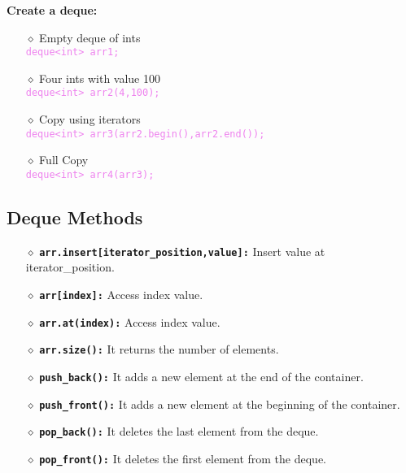 \textbf{Create a deque:}
\begin{itemize}
	\item[{\LARGE $\diamond$}] Empty deque of ints \\
		\tab \textcolor{violet}{\texttt{deque<int> arr1;}}
	\item[{\LARGE $\diamond$}] Four ints with value 100 \\
		\tab \textcolor{violet}{\texttt{deque<int> arr2(4,100);}}
	\item[{\LARGE $\diamond$}] Copy using iterators \\
		\tab \textcolor{violet}{\texttt{deque<int> arr3(arr2.begin(),arr2.end());}}
	\item[{\LARGE $\diamond$}] Full Copy \\
		\tab \textcolor{violet}{\texttt{deque<int> arr4(arr3);}}
\end{itemize}	

\subsection{Deque Methods}

\begin{itemize}
	\item[{\LARGE $\diamond$}]\textbf{\texttt{arr.insert[iterator\_position,value]:}} Insert value at iterator\_position.
	\item[{\LARGE $\diamond$}]\textbf{\texttt{arr[index]:}} Access index value.
	\item[{\LARGE $\diamond$}]\textbf{\texttt{arr.at(index):}} Access index value.
	\item[{\LARGE $\diamond$}]\textbf{\texttt{arr.size():}} It returns the number of elements.
	\item[{\LARGE $\diamond$}]\textbf{\texttt{push\_back():}} It adds a new element at the end of the container.
	\item[{\LARGE $\diamond$}]\textbf{\texttt{push\_front():}} It adds a new element at the beginning of the container.
	\item[{\LARGE $\diamond$}]\textbf{\texttt{pop\_back():}} It deletes the last element from the deque.
	\item[{\LARGE $\diamond$}]\textbf{\texttt{pop\_front():}} It deletes the first element from the deque.
	
\end{itemize}




\newpage
